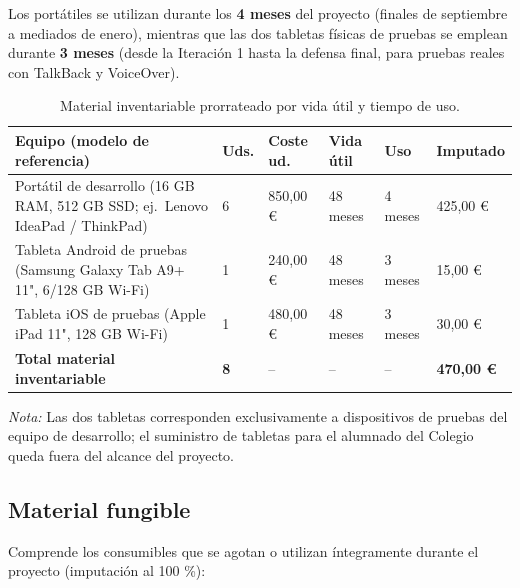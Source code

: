 \documentclass[11pt,a4paper]{article}
\begin{document}
Los portátiles se utilizan durante los \textbf{4 meses} del proyecto (finales de septiembre a mediados de enero), mientras que las dos tabletas físicas de pruebas se emplean durante \textbf{3 meses} (desde la Iteración 1 hasta la defensa final, para pruebas reales con TalkBack y VoiceOver).

\begin{table}[H]
  \centering
  \caption{Material inventariable prorrateado por vida útil y tiempo de uso.}
  \label{tab:inventariable}
  \begin{tabularx}{\linewidth}{@{}Y C{0.8cm} R{1.7cm} C{1.4cm} C{1.3cm} R{1.9cm}@{}}
    \toprule
    \textbf{Equipo (modelo de referencia)} & \textbf{Uds.} & \textbf{Coste ud.} & \textbf{Vida útil} & \textbf{Uso} & \textbf{Imputado} \\
    \midrule
    Portátil de desarrollo (16 GB RAM, 512 GB SSD; ej.\ Lenovo IdeaPad / ThinkPad) & 6 & 850,00 € & 48 meses & 4 meses & 425,00 € \\
    Tableta Android de pruebas (Samsung Galaxy Tab A9+ 11", 6/128 GB Wi-Fi) & 1 & 240,00 € & 48 meses & 3 meses & 15,00 € \\
    Tableta iOS de pruebas (Apple iPad 11", 128 GB Wi-Fi) & 1 & 480,00 € & 48 meses & 3 meses & 30,00 € \\
    \midrule
    \textbf{Total material inventariable} & \textbf{8} & -- & -- & -- & \textbf{470,00 €} \\
    \bottomrule
  \end{tabularx}
\end{table}

\textit{Nota:} Las dos tabletas corresponden exclusivamente a dispositivos de pruebas del equipo de desarrollo; el suministro de tabletas para el alumnado del Colegio queda fuera del alcance del proyecto.

\subsection{Material fungible}

Comprende los consumibles que se agotan o utilizan íntegramente durante el proyecto (imputación al 100 \%):
\end{document}
